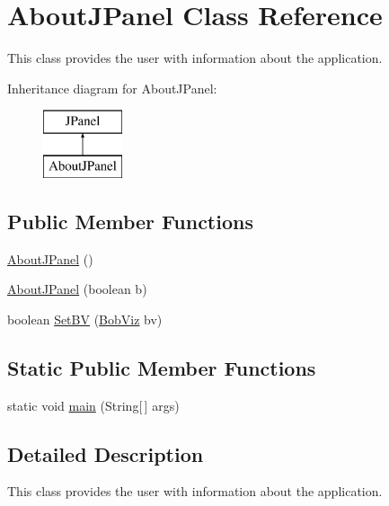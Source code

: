 \hypertarget{class_about_j_panel}{\section{About\-J\-Panel Class Reference}
\label{class_about_j_panel}
}


This class provides the user with information about the application.  


Inheritance diagram for About\-J\-Panel\-:\begin{figure}[H]
\begin{center}
\leavevmode
\includegraphics[height=2.000000cm]{class_about_j_panel}
\end{center}
\end{figure}
\subsection*{Public Member Functions}
\begin{DoxyCompactItemize}
\item 
\hyperlink{class_about_j_panel_a1ddd3b050eb08dd7fca8434cc00e931f}{About\-J\-Panel} ()
\item 
\hyperlink{class_about_j_panel_abb77c372f536a4a5728ad792eff280d3}{About\-J\-Panel} (boolean b)
\item 
boolean \hyperlink{class_about_j_panel_a134c5a6eee7daba01d35a1ca05ddcca1}{Set\-B\-V} (\hyperlink{class_bob_viz}{Bob\-Viz} bv)
\end{DoxyCompactItemize}
\subsection*{Static Public Member Functions}
\begin{DoxyCompactItemize}
\item 
static void \hyperlink{class_about_j_panel_ab6b17f3a162421e23430c81eac5e824f}{main} (String\mbox{[}$\,$\mbox{]} args)
\end{DoxyCompactItemize}


\subsection{Detailed Description}
This class provides the user with information about the application. 

